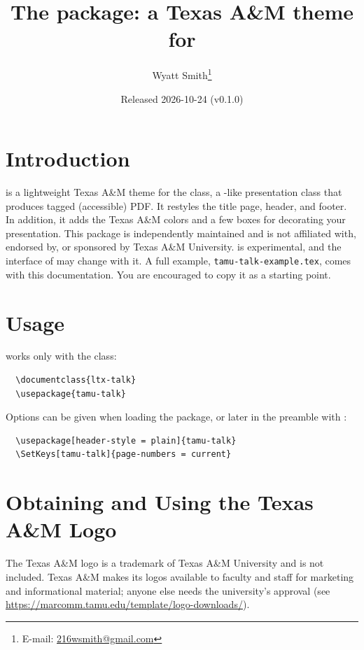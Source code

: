 \documentclass{l3doc}
\title{The \pkg{tamu-talk} package: a Texas A\&M theme for \pkg{ltx-talk}}
\author{Wyatt Smith\thanks{E-mail: \href{mailto:216wsmith@gmail.com}{216wsmith@gmail.com}}}
\date{Released 2026-10-24 (v0.1.0)}
\begin{document}
\maketitle

\begin{documentation}

\section{Introduction}

 is a lightweight Texas A\&M theme for the 
class, a -like presentation class that produces tagged
(accessible) PDF. It restyles the title page, header, and footer.
In addition, it adds the Texas A\&M colors and a few boxes for decorating your presentation.
This package is independently maintained and is not affiliated with,
endorsed by, or sponsored by Texas A\&M University.  is
experimental, and the interface of  may change with it.
A full example, \texttt{tamu-talk-example.tex}, comes with this
documentation. You are encouraged to copy it as a starting point.

\section{Usage}

 works only with the  class:
\begin{verbatim}
  \documentclass{ltx-talk}
  \usepackage{tamu-talk}
\end{verbatim}
Options can be given when loading the package, or later in the preamble with
:
\begin{verbatim}
  \usepackage[header-style = plain]{tamu-talk}
  \SetKeys[tamu-talk]{page-numbers = current}
\end{verbatim}

\section{Obtaining and Using the Texas A\&M Logo}

The Texas A\&M logo is a trademark of Texas A\&M University and is not
included.
Texas A\&M makes its logos available to faculty and staff for marketing and
informational material; anyone else needs the university's approval (see
\url{https://marcomm.tamu.edu/template/logo-downloads/}).


\end{documentation}
\end{document}
